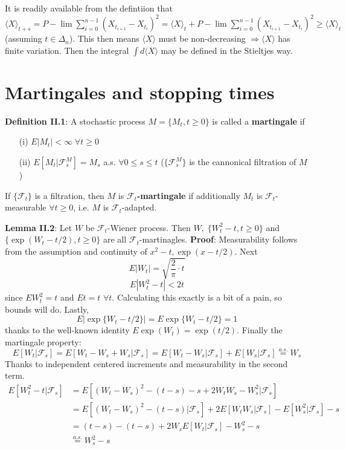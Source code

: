 \documentclass[english]{article}
\newcommand{\note}[1]{\noindent\textbf{#1}}
\newcommand{\F}{\mathcal F}
\newcommand{\as}[1]{\stackrel {a.s.}{#1}}
\begin{document}
It is readily available from the defintiion that $\langle X \rangle_{t+s} = P-\lim \sum^{n-1}_{i=0} (X_{t_{i+1}} - X_{t_i})^2 = \langle X \rangle_t + P-\lim \sum^{n-1}_{i=0} (X_{t_{i+1}} - X_{t_i})^2 \geq \langle X \rangle_t$ (assuming $t\in \Delta_n$). This then means $\langle X\rangle$ must be non-decreasing $\Rightarrow \langle X \rangle$ has finite variation. Then the integral $\int d\langle X\rangle$ may be defined in the Stieltjes way.
 
\section{Martingales and stopping times}
\note{Definition II.1}: A stochastic process $M=\{M_t , t\geq 0\}$ is called a \textbf{martingale} if \begin{enumerate}
\item[(i)] $E|M_t| < \infty \; \forall t\geq 0$
\item[(ii)] $E[M_t | \F^M_s] = M_s$ a.s. $\forall 0\leq s \leq t$ ($\{\F^M_s\}$ is the cannonical filtration of $M$) 
\end{enumerate}
If $\{\F_t\}$ is a filtration, then $M$ is $\F_t$\textbf{-martingale} if additionally $M_t$ is $\F_t$-measurable $\forall t\geq 0$, i.e. $M$ is $\F_t$-adapted. \newline

\note{Lemma II.2}: Let $W$ be $\F_t$-Wiener process. Then $W,\;\{W^2_t-t, t\geq 0\}$ and $\{\exp(W_t - t/2), t\geq 0\}$ are all $\F_t$-martinagles. \newline
\note{Proof}: Measurability follows from the assumption and continuity of $x^2-t, \exp(x-t/2)$. Next
$$E|W_t| = \sqrt{\frac 2\pi \cdot t}$$
$$E|W^2_t - t| < 2t$$
since $EW^2_t = t$ and $Et=t$ $\forall t$. Calculating this exactly is a bit of a pain, so bounds will do. Lastly,
$$E|\exp\{W_t - t/2\}| = E\exp \{W_t - t/2\} = 1$$
thanks to the well-known identity $E\exp (W_t) = \exp (t/2)$. \newline
Finally the martingale property:
$$E[W_t | \F_s] = E[W_t - W_s + W_s| \F_s] = E[W_t - W_s | \F_s ] + E[W_s| \F_s] \as = W_s$$
Thanks to independent centered increments and measurability in the second term.
\begin{align*}  E[W^2_t - t| \F_s] &= E[(W_t - W_s)^2 - (t-s) - s + 2W_t W_s - W^2_s | \F_s] \\
&= E[(W_t - W_s)^2 - (t-s) | \F_s] + 2 E[W_t W_s|\F_s] - E[W^2_s | \F_s] - s \\
&= (t-s) - (t-s) + 2W_s E[W_t| \F_s] - W^2_s -s \\
& \as = W^2_s - s \\
\end{align*}
\end{document}
